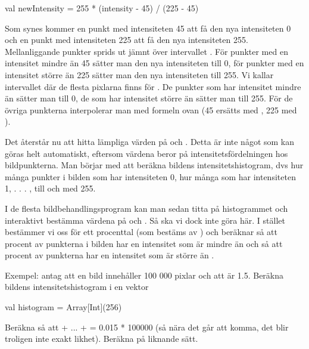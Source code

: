 \begin{Code}
val newIntensity = 255 * (intensity - 45) / (225 - 45)
\end{Code}

Som synes kommer en punkt med intensiteten 45 att få den nya intensiteten 0 och en punkt med intensiteten 225 att få den nya intensiteten 255. Mellanliggande punkter sprids ut jämnt över intervallet \code{[0, 255]}. För punkter med en intensitet mindre än 45 sätter man den nya intensiteten till 0, för punkter med en intensitet större än 225 sätter man den nya intensiteten till 255. Vi kallar intervallet där de flesta pixlarna finns för . De punkter som har intensitet mindre än  sätter man till 0, de som har intensitet större än  sätter man till 255. För de övriga punkterna interpolerar man med formeln ovan (45 ersätts med , 225 med ).

Det återstår nu att hitta lämpliga värden på  och . Detta är inte något som kan göras helt automatiskt, eftersom värdena beror på intensitetsfördelningen hos bildpunkterna. Man börjar med att beräkna bildens intensitetshistogram, dvs hur många punkter i bilden som har intensiteten 0, hur många som har intensiteten 1, . . . , till och med 255.

I de flesta bildbehandlingsprogram kan man sedan titta på histogrammet och interaktivt bestämma värdena på  och . Så ska vi dock inte göra här. I stället bestämmer vi oss för ett procenttal  (som bestäms av ) och beräknar  så att  procent av punkterna i bilden har en intensitet som är mindre än  och  så att  procent av punkterna har en intensitet som är större än .

Exempel: antag att en bild innehåller 100 000 pixlar och att  är 1.5. Beräkna bildens intensitetshistogram i en vektor
\begin{Code} 
val histogram = Array[Int](256)
\end{Code}

Beräkna  så att  + ... +  = 0.015 * 100000 (så nära det går att komma, det blir troligen inte exakt likhet). Beräkna  på liknande sätt.

